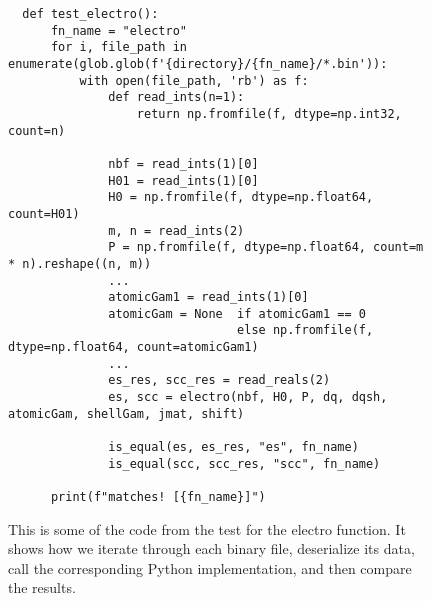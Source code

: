 \begin{figure}[H]
\begin{verbatim}
  def test_electro():
      fn_name = "electro"
      for i, file_path in enumerate(glob.glob(f'{directory}/{fn_name}/*.bin')):
          with open(file_path, 'rb') as f:
              def read_ints(n=1):
                  return np.fromfile(f, dtype=np.int32, count=n)

              nbf = read_ints(1)[0]
              H01 = read_ints(1)[0]
              H0 = np.fromfile(f, dtype=np.float64, count=H01)
              m, n = read_ints(2)
              P = np.fromfile(f, dtype=np.float64, count=m * n).reshape((n, m))
              ...
              atomicGam1 = read_ints(1)[0]
              atomicGam = None  if atomicGam1 == 0
                                else np.fromfile(f, dtype=np.float64, count=atomicGam1)
              ...
              es_res, scc_res = read_reals(2)
              es, scc = electro(nbf, H0, P, dq, dqsh, atomicGam, shellGam, jmat, shift)

              is_equal(es, es_res, "es", fn_name)
              is_equal(scc, scc_res, "scc", fn_name)

      print(f"matches! [{fn_name}]")
\end{verbatim}
\caption{This is some of the code from the test for the electro function. It shows how we iterate through each binary file, deserialize its data, call the corresponding Python implementation, and then compare the results.}
\label{fig:testcode}
\end{figure}
